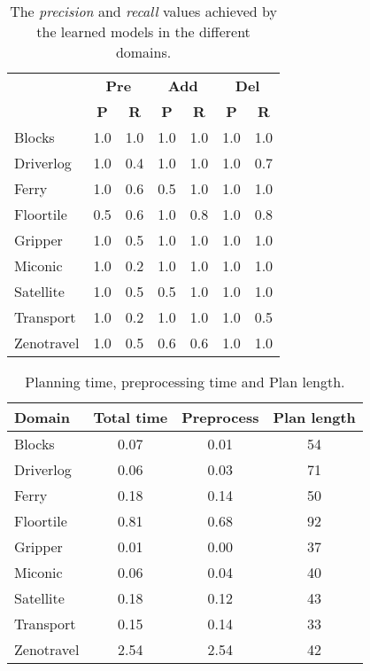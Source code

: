 \documentclass[letterpaper]{article} %
\begin{document}
\begin{table}[hbt!]
\begin{footnotesize}
	\begin{center}
		\begin{tabular}{l|l|l|l|l|l|l|}
			 & \multicolumn{2}{|c|}{\bf Pre} & \multicolumn{2}{|c|}{\bf Add} & \multicolumn{2}{|c|}{\bf Del}  \\ \cline{2-7}			
			  & \multicolumn{1}{|c|}{\bf P} & \multicolumn{1}{|c|}{\bf R} & \multicolumn{1}{|c|}{\bf P} & \multicolumn{1}{|c|}{\bf R} & \multicolumn{1}{|c|}{\bf P} & \multicolumn{1}{|c|}{\bf R} \\
			\hline
			Blocks & 1.0 & 1.0 & 1.0 & 1.0 & 1.0 & 1.0 \\
			Driverlog & 1.0 & 0.4 & 1.0 & 1.0 & 1.0 & 0.7 \\
			Ferry & 1.0 & 0.6 & 0.5 & 1.0 & 1.0 & 1.0 \\
			Floortile & 0.5 & 0.6 & 1.0 & 0.8 & 1.0 & 0.8 \\
			Gripper & 1.0 & 0.5 & 1.0 & 1.0 & 1.0 & 1.0 \\
			Miconic & 1.0 & 0.2 & 1.0 & 1.0 & 1.0 & 1.0 \\
			Satellite & 1.0 & 0.5 & 0.5 & 1.0 & 1.0 & 1.0 \\
			Transport & 1.0 & 0.2 & 1.0 & 1.0 & 1.0 & 0.5 \\
			Zenotravel & 1.0 & 0.5 & 0.6 & 0.6 & 1.0 & 1.0
		\end{tabular}
	\end{center}
	\end{footnotesize}
\caption{\small The {\em precision} and {\em recall} values achieved by the learned models in the different domains.}
\label{tab:results_plans_partial}
\end{table}

\begin{table}[hbt!]
\begin{footnotesize}
	\begin{center}
		\begin{tabular}{l|c|c|c|}			
			Domain & Total time & Preprocess & Plan length  \\
			\hline
			Blocks & 0.07 & 0.01 & 54  \\
			Driverlog & 0.06 & 0.03 & 71 \\
			Ferry & 0.18 & 0.14 & 50 \\
			Floortile & 0.81 & 0.68 & 92 \\
			Gripper & 0.01 & 0.00 & 37 \\
			Miconic & 0.06 & 0.04 & 40  \\
			Satellite & 0.18 & 0.12 & 43 \\
			Transport & 0.15 & 0.14 & 33 \\
			Zenotravel & 2.54 & 2.54 & 42
		\end{tabular}
	\end{center}
        \end{footnotesize}
	\caption{\small Planning time, preprocessing time and Plan length.}
	\label{tab:time_plans_partial}	
\end{table}
\end{document}
